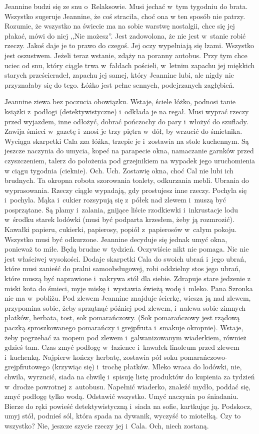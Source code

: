 \documentclass[oneside,polish,12pt,sfheadings]{mwbk}
\begin{document}
Jeannine budzi się ze snu o~Relaksowie. Musi jechać w~tym tygodniu
do brata. Wszystko sugeruje Jeannine, że coś straciła, choć ona w
ten sposób nie patrzy. Rozumie, że wszystko na świecie ma na sobie
warstwę nostalgii, chce się jej płakać, mówi do niej ,,Nie możesz''.
Jest zadowolona, że nie jest w~stanie robić rzeczy. Jakoś daje je
to prawo do czegoś. Jej oczy wypełniają się łzami. Wszystko jest oszustwem.
Jeżeli teraz wstanie, zdąży na poranny autobus. Przy tym chce uciec
od snu, który ciągle trwa w~fałdach pościeli, w~letnim zapachu jej
miękkich starych prześcieradeł, zapachu jej samej, który Jeannine
lubi, ale nigdy nie przyznałaby się do tego. Łóżko jest pełne sennych,
podejrzanych zagłębień.

Jeannine ziewa bez poczucia obowiązku. Wstaje, ściele łóżko, podnosi
tanie książki z~podłogi (detektywistyczne) i~odkłada je na regał.
Musi wyprać rzeczy przed wyjazdem, inne odłożyć, dobrać pończochy
do pary i~włożyć do szuflady. Zawija śmieci w~gazetę i~znosi je trzy
piętra w~dół, by wrzucić do śmietnika. Wyciąga skarpetki Cala zza
łóżka, trzepie je i~zostawia na stole kuchennym. Są jeszcze naczynia
do umycia, kopeć na parapecie okna, namaczanie garnków przed czyszczeniem,
talerz do położenia pod grzejnikiem na wypadek jego uruchomienia w
ciągu tygodnia (cieknie). Och. Uch. Zostawię okna, choć Cal nie lubi
ich brudnych. Ta okropna robota szorowania toalety, odkurzania mebli.
Ubrania do wyprasowania. Rzeczy ciągle wypadają, gdy prostujesz inne
rzeczy. Pochyla się i~pochyla. Mąka i~cukier rozsypują się z~półek
nad zlewem i~muszą być posprzątane. Są plamy i~zalania, gnijące liście
rzodkiewki i~inkrustacje lodu w~środku starek lodówki (musi być podparta
krzesłem, żeby ją rozmrozić). Kawałki papieru, cukierki, papierosy,
popiół z~papierosów w~całym pokoju. Wszystko musi być odkurzone. Jeannine
decyduje się jednak umyć okna, ponieważ to miłe. Będą brudne w~tydzień.
Oczywiście nikt nie pomaga. Nic nie jest właściwej wysokości. Dodaje
skarpetki Cala do swoich ubrań i~jego ubrań, które musi zanieść do
pralni samoobsługowej, robi oddzielny stos jego ubrań, które muszą
być naprawione i~nakrywa stół dla siebie. Zdrapuje stare jedzenie
z miski kota do śmieci, myje miskę i~wystawia świeżą wodę i~mleko.
Pana Szronka nie ma w~pobliżu. Pod zlewem Jeannine znajduje ścierkę,
wiesza ją nad zlewem, przypomina sobie, żeby sprzątnąć później pod
zlewem, i~nalewa sobie zimnych płatków, herbata, tost, sok pomarańczowy.
(Sok pomarańczowy jest rządową paczką sproszkowanego pomarańczy i
grejpfruta i~smakuje okropnie). Wstaje, żeby pogrzebać za mopem pod
zlewem i~galwanizowanym wiaderkiem, również gdzieś tam. Czas zmyć
podłogę w~łazience i~kawałek linoleum przed zlewem i~kuchenką. Najpierw
kończy herbatę, zostawia pół soku pomarańczowo-grejpfrutowego (krzywiąc
się) i~trochę płatków. Mleko wraca do lodówki, nie, chwila, wyrzucić,
siada na chwilę i~spisuję listę produktów do kupienia za tydzień w~drodze powrotnej z~autobusu. Napełnić wiaderko, znaleźć mydło, poddać
się, zmyć podłogę tylko wodą. Odstawić wszystko. Umyć naczynia po
śniadaniu. Bierze do ręki powieść detektywistyczną i~siada na sofie,
kartkując ją. Podskocz, umyj stół, podnieś sól, która spada na dywanik,
wyczyść to miotełką. Czy to wszystko? Nie, jeszcze szycie rzeczy jej
i~Cala. Och, niech zostaną.
\end{document}
